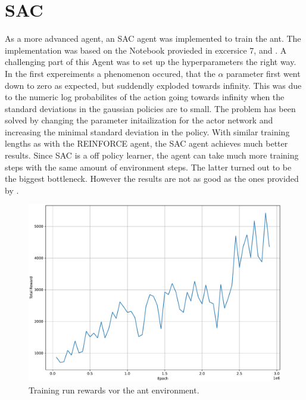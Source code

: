 \documentclass[11pt, a4paper]{article}
\begin{document}
\newpage
\section{SAC}
As a more advanced agent, an SAC agent was implemented to train the ant.
The implementation was based on the Notebook provieded in excersice 7, and \cite{haarnoja2018soft}.
A challenging part of this Agent was to set up the hyperparameters the right way. 
In the first expereiments a phenomenon occured, that the $\alpha$ parameter first went down to zero as 
expected, but suddendly exploded towards infinity. 
This was due to the numeric log probabilites of the action going towards infinity when the standard deviations 
in the gaussian policies are to small. 
The problem has been solved by changing the parameter initailization for the actor network and increasing the minimal
standard deviation in the policy.
With similar training lengths as with the REINFORCE agent, the SAC agent achieves much better results.
Since SAC is a off policy learner, the agent can take much more training steps with the same amount of environment steps.
The latter turned out to be the biggest bottleneck.
However the results are not as good as the ones provided by \cite{haarnoja2018soft}.

\begin{figure}
    \centering
    \includegraphics[width=15cm]{test.pdf}
    \caption{Training run rewards vor the ant environment.}
    \label{SAC:test}
\end{figure}
\end{document}
